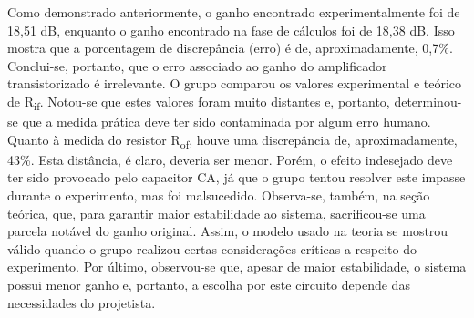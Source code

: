 \documentclass[journal, a4paper]{IEEEtran}
\begin{document}
    \tab  Como demonstrado anteriormente, o ganho encontrado experimentalmente foi de 18,51 dB, enquanto o ganho encontrado na fase de cálculos foi de 18,38 dB. Isso mostra que a porcentagem de discrepância (erro) é de, aproximadamente, 0,7\%. Conclui-se, portanto, que o erro associado ao ganho do amplificador transistorizado é irrelevante. O grupo comparou os valores experimental e teórico de R\textsubscript{if}. Notou-se que estes valores foram muito distantes e, portanto, determinou-se que a medida prática deve ter sido contaminada por algum erro humano. Quanto à medida do resistor R\textsubscript{of}, houve uma discrepância de, aproximadamente, 43\%. Esta distância, é claro, deveria ser menor. Porém, o efeito indesejado deve ter sido provocado pelo capacitor CA, já que o grupo tentou resolver este impasse durante o experimento, mas foi malsucedido.  Observa-se, também, na seção teórica, que, para garantir maior estabilidade ao sistema, sacrificou-se uma parcela notável do ganho original. Assim, o modelo usado na teoria se mostrou válido quando o grupo realizou certas considerações críticas a respeito do experimento. Por último, observou-se que, apesar de maior estabilidade, o sistema possui menor ganho e, portanto, a escolha por este circuito depende das necessidades do projetista.
\end{document}
